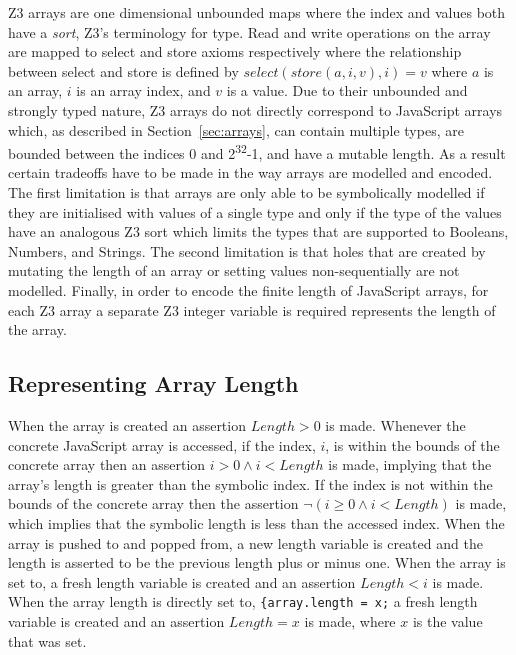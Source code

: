 \documentclass[]{final_report}
\begin{document}
Z3 arrays are one dimensional unbounded maps where the index and values both have a \textit{sort}, Z3's terminology for type. Read and write operations on the array are mapped to select and store axioms respectively where the relationship between select and store is defined by $select(store(a, i, v), i) = v$ where $a$ is an array, $i$ is an array index, and $v$ is a value. Due to their unbounded and strongly typed nature, Z3 arrays do not directly correspond to JavaScript arrays which, as described in Section~\ref{sec:arrays}, can contain multiple types, are bounded between the indices 0 and 2\textsuperscript{32}-1, and have a mutable length. As a result certain tradeoffs have to be made in the way arrays are modelled and encoded. The first limitation is that arrays are only able to be symbolically modelled if they are initialised with values of a single type and only if the type of the values have an analogous Z3 sort which limits the types that are supported to Booleans, Numbers, and Strings. The second limitation is that holes that are created by mutating the length of an array or setting values non-sequentially are not modelled. Finally, in order to encode the finite length of JavaScript arrays, for each Z3 array a separate Z3 integer variable is required represents the length of the array. 

\subsection{Representing Array Length}
When the array is created an assertion $Length > 0$ is made. Whenever the concrete JavaScript array is accessed, if the index, $i$, is within the bounds of the concrete array then an assertion $i > 0 \land i < Length$ is made, implying that the array's length is greater than the symbolic index. If the index is not within the bounds of the concrete array then the assertion $\lnot{(i \geq 0 \land i < Length)}$ is made, which implies that the symbolic length is less than the accessed index. When the array is pushed to and popped from, a new length variable is created and the length is asserted to be the previous length plus or minus one. When the array is set to, a fresh length variable is created and an assertion $Length < i$ is made. When the array length is directly set to, \lstinline|{array.length = x;| a fresh length variable is created and an assertion $Length = x$ is made, where $x$ is the value that was set.
\end{document}
